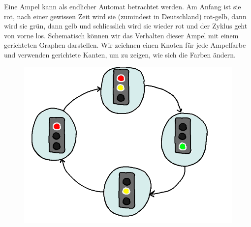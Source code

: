 %
%
Eine Ampel kann als endlicher Automat betrachtet werden. Am Anfang ist sie rot, nach einer gewissen Zeit wird sie (zumindest in Deutschland) rot-gelb, dann wird sie grün, dann gelb und schliesslich wird sie wieder rot und der Zyklus geht von vorne los. Schematisch können wir das Verhalten dieser Ampel mit einem gerichteten Graphen darstellen. Wir zeichnen einen Knoten für jede Ampelfarbe und verwenden gerichtete Kanten, um zu zeigen, wie sich die Farben ändern.
\begin{figure}[H]
\centering
\includegraphics[width=0.5\linewidth]{Pictures/Ampel.png}
\end{figure}

